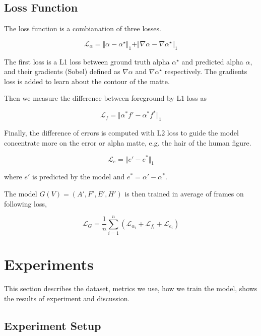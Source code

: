 \documentclass[final]{cvpr}
\begin{document}
\subsection{Loss Function}

The loss function is a combianation of three losses.

\begin{equation}\label{lossAlpha}
    \mathcal{L}_\alpha=\Vert\alpha-\alpha^\star\Vert_1+\Vert\nabla\alpha-\nabla\alpha^\star\Vert_1
\end{equation}

The first loss is a L1 loss between ground truth alpha $\alpha^\star$ and predicted alpha $\alpha$, and their gradients (Sobel) defined as $\nabla \alpha$ and $\nabla \alpha^\star$ respectively.
The gradients loss is added to learn about the contour of the matte.

Then we measure the difference between foreground by L1 loss as

\begin{equation}\label{lossForeground}
    \mathcal{L}_f=\Vert\alpha^*f'-\alpha^*f^*\Vert_1
\end{equation}

Finally, the difference of errors is computed with L2 loss to guide the model concentrate more on the error or alpha matte, e.g. the hair of the human figure.

\begin{equation}\label{lossError}
    \mathcal{L}_e=\Vert e'-e^*\Vert_1
\end{equation}

where $e'$ is predicted by the model and $e^*=\alpha'-\alpha^*$.

The model $G(V)=(A',F',E',H')$ is then trained in average of frames on following loss,

\begin{equation}\label{lossG}
    \mathcal{L}_G=\frac{1}{n}\sum_{i=1}^n\left(\mathcal{L}_{\alpha_i}+\mathcal{L}_{f_i}+\mathcal{L}_{e_i}\right)
\end{equation}

\section{Experiments}

This section describes the dataset, metrics we use, how we train the model, shows the results of experiment and discussion.

\subsection{Experiment Setup}
\end{document}
